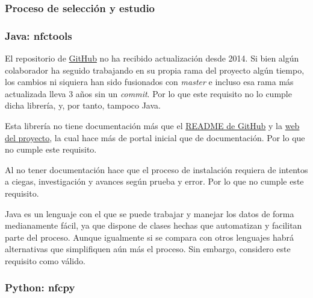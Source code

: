 \subsubsection{Proceso de selección y estudio}

\subsubsection{Java: nfctools}

\begin{todolist}
    \item El repositorio de \href{https://github.com/grundid/nfctools}{GitHub}
    no ha recibido actualización desde 2014. Si bien algún colaborador ha
    seguido trabajando en su propia rama del proyecto algún tiempo, los cambios
    ni siquiera han sido fusionados con \emph{master} e incluso esa rama más
    actualizada lleva 3 años sin un \emph{commit}. Por lo que este requisito no lo
    cumple dicha librería, y, por tanto, tampoco Java.
    \item Esta librería no tiene documentación más que el
    \href{https://github.com/grundid/nfctools/blob/master/README}{README de
    GitHub} y la \href{https://www.grundid.de/nfc/index.html}{web del proyecto},
    la cual hace más de portal inicial que de documentación. Por lo que no
    cumple este requisito.
    \item Al no tener documentación hace que el proceso de instalación requiera
    de intentos a ciegas, investigación y avances según prueba y error. Por lo
    que no cumple este requisito.
    \item[\xcmark] Java es un lenguaje con el que se puede trabajar y manejar
    los datos de forma medianamente fácil, ya que dispone de clases hechas que
    automatizan y facilitan parte del proceso. Aunque igualmente si se compara
    con otros lenguajes habrá alternativas que simplifiquen aún más el proceso.
    Sin embargo, considero este requisito como válido.
\end{todolist}

\subsubsection{Python: nfcpy}

